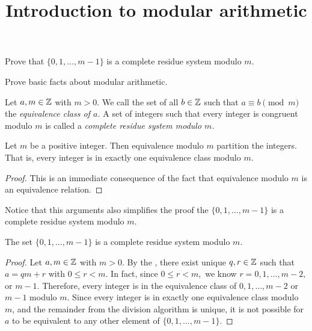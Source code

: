 \documentclass{ximera}
\title{Introduction to modular arithmetic}
\begin{document}
\begin{abstract}
\end{abstract}
\maketitle


\begin{obj}
 \item Prove that $\{0,1,\dots,m-1\}$ is a complete residue system modulo $m$.
 \item Prove basic facts about modular arithmetic.
\end{obj}


\begin{defn}\label{defn:complete-residue}
    Let $a,m\in\mathbb Z$ with $m>0$. We call the set of all $b\in\mathbb Z$ such that $a\equiv b \pmod{m}$ the \emph{equivalence class of $a$.} A set of integers such that every integer is congruent modulo $m$ is called a \emph{complete residue system modulo $m$.}
\end{defn}

\begin{proposition}\label{cor:mod-partition}
    Let $m$ be a positive integer. Then equivalence modulo $m$ partition the integers. That is, every integer is in exactly one equivalence class modulo $m$.

    \begin{proof}
        This is an immediate consequence of the fact that equivalence modulo $m$ is an equivalence relation.
    \end{proof}
\end{proposition}
 
Notice that this arguments also simplifies the proof the $\{0,1,\dots,m-1\}$ is a complete residue system modulo $m$.
\begin{proposition}\label{prop:complete-residue}
    The set $\{0,1,\dots,m-1\}$ is a complete residue system modulo $m$.

    \begin{proof}
        Let $a,m\in\mathbb Z$ with $m>0$. By the , there exist unique $q,r\in\mathbb Z$ such that $a=qm+r$ with $0\leq r <m$. In fact, since $0\leq r<m,$ we know $r=0,1,\dots, m-2,$ or $m-1$. Therefore, every integer is in the equivalence class of $0,1,\dots, m-2$ or $m-1$ modulo $m$.
        Since every integer is in exactly one equivalence class modulo $m$, and the remainder from the division algorithm is unique, it is not possible for $a$ to be equivalent to any other element of $\{0,1,\dots,m-1\}$. 
    \end{proof}
\end{proposition}
\end{document}
